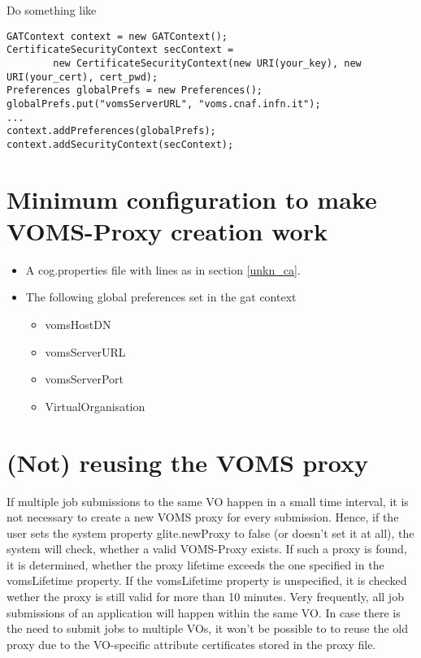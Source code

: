 \documentclass{scrreprt}
\begin{document}
Do something like

\begin{verbatim}
GATContext context = new GATContext();
CertificateSecurityContext secContext = 
		new CertificateSecurityContext(new URI(your_key), new URI(your_cert), cert_pwd);
Preferences globalPrefs = new Preferences();
globalPrefs.put("vomsServerURL", "voms.cnaf.infn.it");
...
context.addPreferences(globalPrefs);
context.addSecurityContext(secContext);
\end{verbatim}

\section{Minimum configuration to make VOMS-Proxy creation work}\label{min_voms_config}

\begin{itemize}
 \item A cog.properties file with lines as in section \ref{unkn_ca}.
 \item The following global preferences set in the gat context
 \begin{itemize}
  \item vomsHostDN
  \item vomsServerURL
  \item vomsServerPort
  \item VirtualOrganisation 
 \end{itemize}
\end{itemize}

\section{(Not) reusing the VOMS proxy}

If multiple job submissions to the same VO happen in a small time interval, it is not necessary to create
a new VOMS proxy for every submission. 
Hence, if the user sets the system property glite.newProxy to false (or doesn't set it at all), 
the system will check, whether a valid VOMS-Proxy exists. If such a proxy is found, it is determined, whether the proxy lifetime exceeds the one specified in
the vomsLifetime property. If the vomsLifetime property is unspecified, it is checked wether the proxy is still
valid for more than 10 minutes.
Very frequently, all job submissions of an application will happen within the same VO. In case there is the
need to submit jobs to multiple VOs, it won't be possible to to reuse the old proxy due to the VO-specific
attribute certificates stored in the proxy file. 
\end{document}
